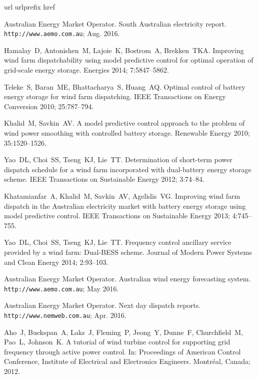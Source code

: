 \documentclass[3p,times,procedia]{elsarticle}
\begin{document}
\begin{thebibliography}{10}
\expandafter\ifx\csname url\endcsname\relax
  \def\url#1{\texttt{#1}}\fi
\expandafter\ifx\csname urlprefix\endcsname\relax\def\urlprefix{URL }\fi
\expandafter\ifx\csname href\endcsname\relax
  \def\href#1#2{#2} \def\path#1{#1}\fi

{Australian Energy Market Operator}. {S}outh {A}ustralian electricity report.
  \url{http://www.aemo.com.au};
  Aug. 2016.

Hamalay~D, Antonishen~M, Lajoie~K, Bostrom~A, Brekken~TKA. Improving
  wind farm dispatchability using model predictive control for optimal
  operation of grid-scale energy storage. Energies 2014; 7:5847--5862.

Teleke~S, Baran~ME, Bhattacharya~S, Huang~AQ. Optimal control of
  battery energy storage for wind farm dispatching. IEEE Transactions on Energy
  Conversion 2010; 25:787--794.

Khalid~M, Savkin~AV. A model predictive control approach to the problem of
  wind power smoothing with controlled battery storage. Renewable Energy 2010; 
  35:1520--1526.

Yao~DL, Choi~SS, Tseng~KJ, Lie~TT. Determination of short-term
  power dispatch schedule for a wind farm incorporated with dual-battery energy
  storage scheme. IEEE Transactions on Sustainable Energy 2012; 3:74--84.

Khatamianfar~A, Khalid~M, Savkin~AV, Agelidis~VG. Improving wind farm
  dispatch in the {A}ustralian electricity market with battery energy storage
  using model predictive control. IEEE Transactions on Sustainable Energy 2013;
  4:745--755.

Yao~DL, Choi~SS, Tseng~KJ, Lie~TT. Frequency control ancillary
  service provided by a wind farm: Dual-{BESS} scheme. Journal of Modern Power
  Systems and Clean Energy 2014; 2:93--103.

{Australian Energy Market Operator}. Australian wind energy forecasting system.
  \url{http://www.aemo.com.au};
  May 2016.

{Australian Energy Market Operator}. Next day dispatch reports.
  \url{http://www.nemweb.com.au}; Apr. 2016.

Aho~J, Buckspan~A, Laks~J, Fleming~P, Jeong~Y, Dunne~F, Churchfield~M,
  Pao~L, Johnson~K. A tutorial of wind turbine control for supporting grid
  frequency through active power control. In: Proceedings of American Control Conference,
  Institute of Electrical and Electronics Engineers. Montr\'eal, Canada; 2012.

\end{thebibliography}
\end{document}
